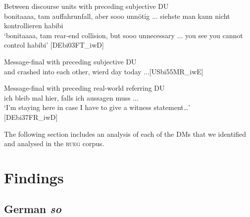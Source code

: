 \documentclass[output=paper,colorlinks,citecolor=brown]{langscibook}
\begin{document}
\ea Between discourse units with preceding subjective DU \\ 
{bonitaaaa, tam auffahrunfall, aber sooo unnötig ... siehste man kann nicht kontrollieren habibi}\label{ex:labrenzetal:8} \\
\glt ‘bonitaaaa, tam rear-end collision, but sooo unnecessary ... you see you cannot control habibi’ \hfill[DEbi03FT\_iwD]
\z

\ea Message-final with preceding subjective DU \label{ex:labrenzetal:9}\\
{and crashed into each other, wierd day today ...}\hfill[USbi55MR\_iwE]
\z

\ea Message-final with preceding real-world referring DU \\ 
{ich bleib mal hier, falls ich aussagen muss ...}\label{ex:labrenzetal:10}\\
\glt ‘I’m staying here in case I have to give a witness statement…’\\
\hfill[DEbi37FR\_iwD]
\z


\noindent The following section includes an analysis of each of the DMs that we identified and analysed in the \textsc{rueg} corpus. 

\section{Findings}
\label{sec:labrenzetal:Findings}
\subsection{German \emph{so}}
\label{sec:sub:labrenzetal:German_so}
\end{document}
